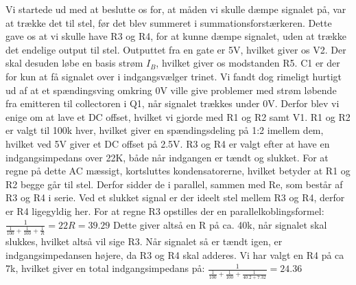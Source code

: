Vi startede ud med at beslutte os for, at måden vi skulle dæmpe signalet på, var at trække det til stel, før det blev summeret i summationsforstærkeren. Dette gave os at vi skulle have R3 og R4, for at kunne dæmpe signalet, uden at trække det endelige output til stel. Outputtet fra en gate er 5V, hvilket giver os V2. Der skal desuden løbe en basis strøm $I_B$, hvilket giver os modstanden R5. C1 er der for kun at få signalet over i indgangsvælger trinet. Vi fandt dog rimeligt hurtigt ud af at et spændingsving omkring 0V ville give problemer med strøm løbende fra emitteren til collectoren i Q1, når signalet trækkes under 0V. Derfor blev vi enige om at lave et DC offset, hvilket vi gjorde med R1 og R2 samt V1. R1 og R2 er valgt til 100k hver, hvilket giver en spændingsdeling på 1:2 imellem dem, hvilket ved 5V giver et DC offset på 2.5V. R3 og R4 er valgt efter at have en indgangsimpedans over 22K, både når indgangen er tændt og slukket. For at regne på dette AC mæssigt, kortsluttes kondensatorerne, hvilket betyder at R1 og R2 begge går til stel. Derfor sidder de i parallel, sammen med Re, som består af R3 og R4 i serie. Ved et slukket signal er der ideelt stel mellem R3 og R4, derfor er R4 ligegyldig her. For at regne R3 opstilles der en parallelkoblingsformel:
$
\frac{1}{\frac{1}{100}+\frac{1}{100}+\frac{1}{R}}=22
R=39.29
$
Dette giver altså en R på ca. 40k, når signalet skal slukkes, hvilket altså vil sige R3. Når signalet så er tændt igen, er indgangsimpedansen højere, da R3 og R4 skal adderes. Vi har valgt en R4 på ca 7k, hvilket giver en total indgangsimpedans på:
$
\frac{1}{\frac{1}{100}+\frac{1}{100}+\frac{1}{40.2+7.32}}=24.36
$